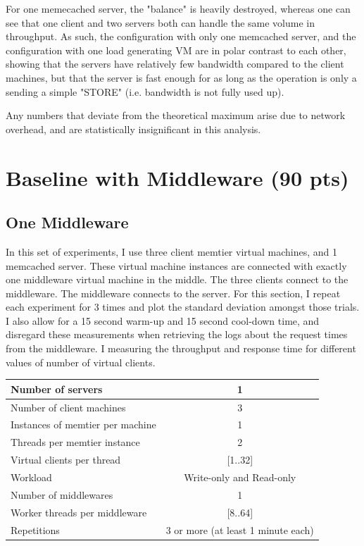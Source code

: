 \documentclass[11pt,a4paper]{article}
\begin{document}
For one memecached server, the "balance" is heavily destroyed, whereas one can see that one client and two servers both can handle the same volume in throughput.
As such, the configuration with only one memcached server, and the configuration with one load generating VM are in polar contrast to each other, showing that the servers have relatively few bandwidth compared to the client machines, but that the server is fast enough for as long as the operation is only a sending a simple "STORE" (i.e. bandwidth is not fully used up).

Any numbers that deviate from the theoretical maximum arise due to network overhead, and are statistically insignificant in this analysis.

\section{Baseline with Middleware (90 pts)}

\subsection{One Middleware}

In this set of experiments, I use three client memtier virtual machines, and 1 memcached server.
These virtual machine instances are connected with exactly one middleware virtual machine in the middle.
The three clients connect to the middleware. 
The middleware connects to the server.
For this section, I repeat each experiment for 3 times and plot the standard deviation amongst those trials.
I also allow for a 15 second warm-up and 15 second cool-down time, and disregard these measurements when retrieving the logs about the request times from the middleware.
I measuring the throughput and response time for different values of number of virtual clients.

\begin{center}
	\scriptsize{
		\begin{tabular}{|l|c|}
			\hline Number of servers                & 1                        \\ 
			\hline Number of client machines        & 3                        \\ 
			\hline Instances of memtier per machine & 1                        \\ 
			\hline Threads per memtier instance     & 2                        \\
			\hline Virtual clients per thread       & [1..32]                  \\ 
			\hline Workload                         & Write-only and Read-only \\
			\hline Number of middlewares            & 1                        \\
			\hline Worker threads per middleware    & [8..64]                  \\
			\hline Repetitions                      & 3 or more (at least 1 minute each)                \\ 
			\hline 
		\end{tabular}
	} 
\end{center}
\end{document}
